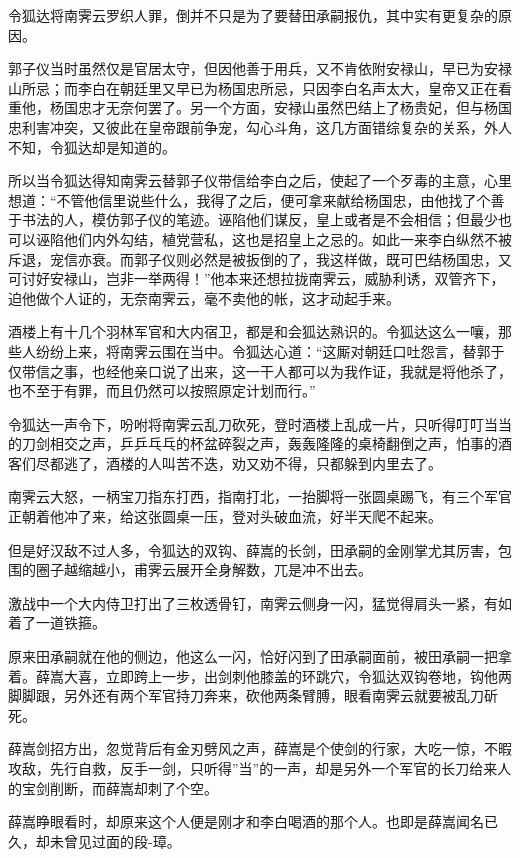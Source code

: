 \documentclass[12pt,oneside]{book}
\begin{document}
令狐达将南霁云罗织人罪，倒并不只是为了要替田承嗣报仇，其中实有更复杂的原因。

郭子仪当时虽然仅是官居太守，但因他善于用兵，又不肯依附安禄山，早已为安禄山所忌；而李白在朝廷里又早已为杨国忠所忌，只因李白名声太大，皇帝又正在看重他，杨国忠才无奈何罢了。另一个方面，安禄山虽然巴结上了杨贵妃，但与杨国忠利害冲突，又彼此在皇帝跟前争宠，勾心斗角，这几方面错综复杂的关系，外人不知，令狐达却是知道的。

所以当令狐达得知南霁云替郭子仪带信给李白之后，使起了一个歹毒的主意，心里想道：``不管他信里说些什么，我得了之后，便可拿来献给杨国忠，由他找了个善于书法的人，模仿郭子仪的笔迹。诬陷他们谋反，皇上或者是不会相信；但最少也可以诬陷他们内外勾结，植党营私，这也是招皇上之忌的。如此一来李白纵然不被斥退，宠信亦衰。而郭子仪则必然是被扳倒的了，我这样做，既可巴结杨国忠，又可讨好安禄山，岂非一举两得！''他本来还想拉拢南霁云，威胁利诱，双管齐下，迫他做个人证的，无奈南霁云，毫不卖他的帐，这才动起手来。

酒楼上有十几个羽林军官和大内宿卫，都是和会狐达熟识的。令狐达这么一嚷，那些人纷纷上来，将南霁云围在当中。令狐达心道：``这厮对朝廷口吐怨言，替郭于仅带信之事，也经他亲口说了出来，这一干人都可以为我作证，我就是将他杀了，也不至于有罪，而且仍然可以按照原定计划而行。''

令狐达一声令下，吩咐将南霁云乱刀砍死，登时酒楼上乱成一片，只听得叮叮当当的刀剑相交之声，乒乒乓乓的杯盆碎裂之声，轰轰隆隆的桌椅翻倒之声，怕事的酒客们尽都逃了，酒楼的人叫苦不迭，劝又劝不得，只都躲到内里去了。

南霁云大怒，一柄宝刀指东打西，指南打北，一抬脚将一张圆桌踢飞，有三个军官正朝着他冲了来，给这张圆桌一压，登对头破血流，好半天爬不起来。

但是好汉敌不过人多，令狐达的双钩、薛嵩的长剑，田承嗣的金刚掌尤其厉害，包围的圈子越缩越小，甫霁云展开全身解数，兀是冲不出去。

激战中一个大内侍卫打出了三枚透骨钉，南霁云侧身一闪，猛觉得肩头一紧，有如着了一道铁箍。

原来田承嗣就在他的侧边，他这么一闪，恰好闪到了田承嗣面前，被田承嗣一把拿着。薛嵩大喜，立即跨上一步，出剑刺他膝盖的环跳穴，令狐达双钩卷地，钩他两脚脚跟，另外还有两个军官持刀奔来，砍他两条臂膊，眼看南霁云就要被乱刀斫死。

薛嵩剑招方出，忽觉背后有金刃劈风之声，薛嵩是个使剑的行家，大吃一惊，不暇攻敌，先行自救，反手一剑，只听得''当''的一声，却是另外一个军官的长刀给来人的宝剑削断，而薛嵩却刺了个空。

薛嵩睁眼看时，却原来这个人便是刚才和李白喝酒的那个人。也即是薛嵩闻名已久，却未曾见过面的段-璋。
\end{document}
